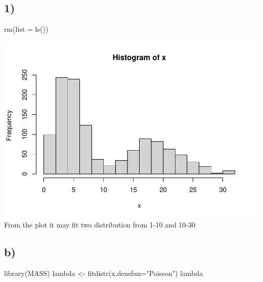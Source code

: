 \documentclass[
]{article}
\newenvironment{Shaded}{\begin{snugshade}}{\end{snugshade}}
\newcommand{\AttributeTok}[1]{\textcolor[rgb]{0.77,0.63,0.00}{#1}}
\newcommand{\FunctionTok}[1]{\textcolor[rgb]{0.00,0.00,0.00}{#1}}
\newcommand{\NormalTok}[1]{#1}
\newcommand{\OtherTok}[1]{\textcolor[rgb]{0.56,0.35,0.01}{#1}}
\newcommand{\SpecialCharTok}[1]{\textcolor[rgb]{0.00,0.00,0.00}{#1}}
\newcommand{\StringTok}[1]{\textcolor[rgb]{0.31,0.60,0.02}{#1}}
\begin{document}
\hypertarget{section}{%
\subsection{1)}\label{section}}

\begin{Shaded}
\begin{Highlighting}[]
\FunctionTok{rm}\NormalTok{(}\AttributeTok{list =} \FunctionTok{ls}\NormalTok{())}
\end{Highlighting}
\end{Shaded}

\begin{Shaded}
\end{Shaded}

\includegraphics{539-hw3_files/figure-latex/unnamed-chunk-14-1.pdf} From
the plot it may fit two distribution from 1-10 and 10-30

\hypertarget{b-3}{%
\subsection{b)}\label{b-3}}

\begin{Shaded}
\begin{Highlighting}[]
\FunctionTok{library}\NormalTok{(MASS)}
\NormalTok{lambda }\OtherTok{\textless{}{-}} \FunctionTok{fitdistr}\NormalTok{(x,}\AttributeTok{densfun=}\StringTok{"Poisson"}\NormalTok{)}
\NormalTok{lambda}
\end{Highlighting}
\end{Shaded}
\end{document}
